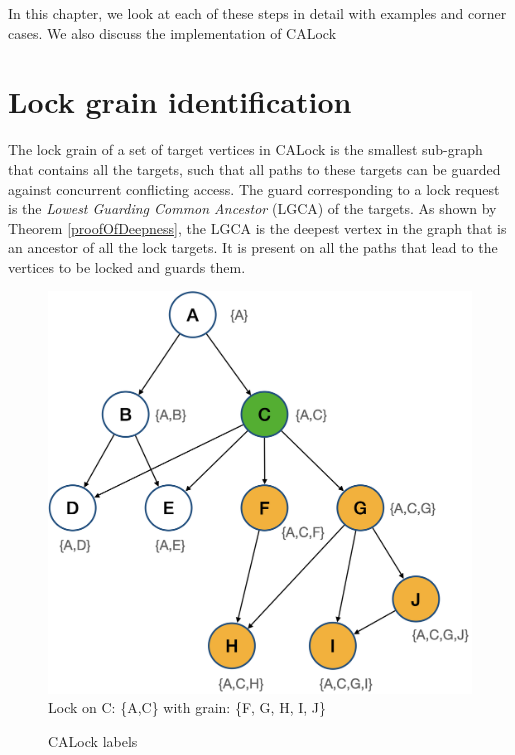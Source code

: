 In this chapter, we look at each of these steps in detail with examples and corner cases. We also discuss the implementation of CALock 



\section{Lock grain identification}
The lock grain of a set of target vertices in CALock is the smallest sub-graph that contains all the targets, such that all paths to these targets can be guarded against concurrent conflicting access. The guard corresponding to a lock request is the \emph{Lowest Guarding Common Ancestor} (LGCA) of the targets. As shown by Theorem \ref{proofOfDeepness}, the LGCA is the deepest vertex in the graph that is an ancestor of all the lock targets. It is present on all the paths that lead to the vertices to be locked and guards them. 


\begin{figure}[h]
	\centering
	\captionsetup{justification=centering}
	\includegraphics[width=.6\columnwidth]{figures/CALockExample_locked.png}\\
	{\small
		Lock on C: \{A,C\} with grain: \{F, G, H, I, J\}
	}
	\caption{CALock labels}
	\label{calockexample}
\end{figure}

